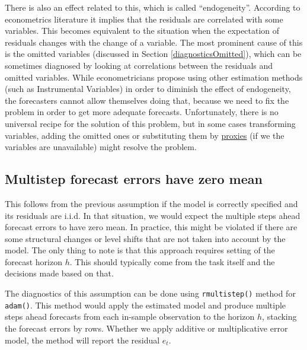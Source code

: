 \documentclass[
]{book}
\theoremstyle{definition}
\theoremstyle{definition}
\theoremstyle{definition}
\theoremstyle{definition}
\theoremstyle{remark}
\begin{document}
There is also an effect related to this, which is called ``endogeneity''. According to econometrics literature it implies that the residuals are correlated with some variables. This becomes equivalent to the situation when the expectation of residuals changes with the change of a variable. The most prominent cause of this is the omitted variables (discussed in Section \ref{diagnosticsOmitted}), which can be sometimes diagnosed by looking at correlations between the residuals and omitted variables. While econometricians propose using other estimation methods (such as Instrumental Variables) in order to diminish the effect of endogeneity, the forecasters cannot allow themselves doing that, because we need to fix the problem in order to get more adequate forecasts. Unfortunately, there is no universal recipe for the solution of this problem, but in some cases transforming variables, adding the omitted ones or substituting them by \href{https://en.wikipedia.org/wiki/Proxy_(statistics)}{proxies} (if we the variables are unavailable) might resolve the problem.

\hypertarget{diagnosticsResidualsIIDExpectationMultiple}{%
\subsection{Multistep forecast errors have zero mean}\label{diagnosticsResidualsIIDExpectationMultiple}}

This follows from the previous assumption if the model is correctly specified and its residuals are i.i.d. In that situation, we would expect the multiple steps ahead forecast errors to have zero mean. In practice, this might be violated if there are some structural changes or level shifts that are not taken into account by the model. The only thing to note is that this approach requires setting of the forecast horizon \(h\). This should typically come from the task itself and the decisions made based on that.

The diagnostics of this assumption can be done using \texttt{rmultistep()} method for \texttt{adam()}. This method would apply the estimated model and produce multiple steps ahead forecasts from each in-sample observation to the horizon \(h\), stacking the forecast errors by rows. Whether we apply additive or multiplicative error model, the method will report the residual \(e_t\).
\end{document}
